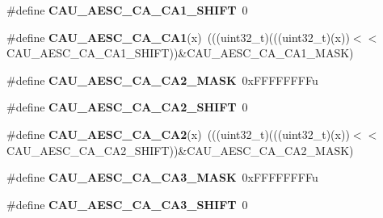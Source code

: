 \begin{DoxyCompactItemize}
\item 
\#define {\bfseries C\+A\+U\+\_\+\+A\+E\+S\+C\+\_\+\+C\+A\+\_\+\+C\+A1\+\_\+\+S\+H\+I\+FT}~0\hypertarget{group__CAU__Register__Masks_ga9b82dd689e9be0ca141d7be86cd16c73}{}\label{group__CAU__Register__Masks_ga9b82dd689e9be0ca141d7be86cd16c73}

\item 
\#define {\bfseries C\+A\+U\+\_\+\+A\+E\+S\+C\+\_\+\+C\+A\+\_\+\+C\+A1}(x)~(((uint32\+\_\+t)(((uint32\+\_\+t)(x))$<$$<$C\+A\+U\+\_\+\+A\+E\+S\+C\+\_\+\+C\+A\+\_\+\+C\+A1\+\_\+\+S\+H\+I\+FT))\&C\+A\+U\+\_\+\+A\+E\+S\+C\+\_\+\+C\+A\+\_\+\+C\+A1\+\_\+\+M\+A\+SK)\hypertarget{group__CAU__Register__Masks_gae92609b9dc76e27da2f6cec529382784}{}\label{group__CAU__Register__Masks_gae92609b9dc76e27da2f6cec529382784}

\item 
\#define {\bfseries C\+A\+U\+\_\+\+A\+E\+S\+C\+\_\+\+C\+A\+\_\+\+C\+A2\+\_\+\+M\+A\+SK}~0x\+F\+F\+F\+F\+F\+F\+F\+Fu\hypertarget{group__CAU__Register__Masks_ga228d26ca32382c1c7fc31336cab80532}{}\label{group__CAU__Register__Masks_ga228d26ca32382c1c7fc31336cab80532}

\item 
\#define {\bfseries C\+A\+U\+\_\+\+A\+E\+S\+C\+\_\+\+C\+A\+\_\+\+C\+A2\+\_\+\+S\+H\+I\+FT}~0\hypertarget{group__CAU__Register__Masks_gafb8c8ffc45b20809178af540f5c15280}{}\label{group__CAU__Register__Masks_gafb8c8ffc45b20809178af540f5c15280}

\item 
\#define {\bfseries C\+A\+U\+\_\+\+A\+E\+S\+C\+\_\+\+C\+A\+\_\+\+C\+A2}(x)~(((uint32\+\_\+t)(((uint32\+\_\+t)(x))$<$$<$C\+A\+U\+\_\+\+A\+E\+S\+C\+\_\+\+C\+A\+\_\+\+C\+A2\+\_\+\+S\+H\+I\+FT))\&C\+A\+U\+\_\+\+A\+E\+S\+C\+\_\+\+C\+A\+\_\+\+C\+A2\+\_\+\+M\+A\+SK)\hypertarget{group__CAU__Register__Masks_gaf72263318202db500bf3bd7d0caf0b0d}{}\label{group__CAU__Register__Masks_gaf72263318202db500bf3bd7d0caf0b0d}

\item 
\#define {\bfseries C\+A\+U\+\_\+\+A\+E\+S\+C\+\_\+\+C\+A\+\_\+\+C\+A3\+\_\+\+M\+A\+SK}~0x\+F\+F\+F\+F\+F\+F\+F\+Fu\hypertarget{group__CAU__Register__Masks_ga2acd3c4e0bdc22621d5a9992adcc571e}{}\label{group__CAU__Register__Masks_ga2acd3c4e0bdc22621d5a9992adcc571e}

\item 
\#define {\bfseries C\+A\+U\+\_\+\+A\+E\+S\+C\+\_\+\+C\+A\+\_\+\+C\+A3\+\_\+\+S\+H\+I\+FT}~0\hypertarget{group__CAU__Register__Masks_gacb3a23977b7f207a38793d67e7cf5691}{}\label{group__CAU__Register__Masks_gacb3a23977b7f207a38793d67e7cf5691}


\end{DoxyCompactItemize}
